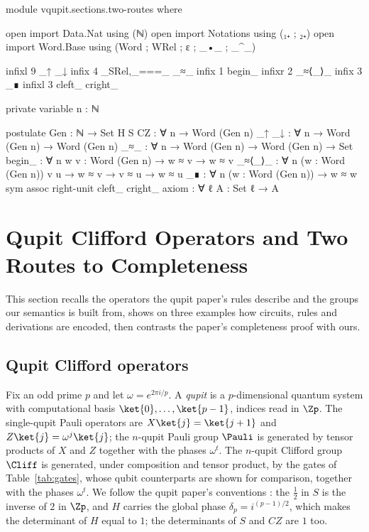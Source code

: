 \begin{code}[hide]
module vqupit.sections.two-routes where

open import Data.Nat using (ℕ)
open import Notations using (₁₊ ; ₂₊)
open import Word.Base using (Word ; WRel ; ε ; _•_ ; _^_)

infixl 9 _↑ _↓
infix 4 _SRel,_===_ _≈_
infix 1 begin_
infixr 2 _≈⟨_⟩_
infix 3 _∎
infixl 3 cleft_ cright_

private variable
  n : ℕ

postulate
  Gen : ℕ → Set
  H S CZ : ∀ {n} → Word (Gen n)
  _↑ _↓ : ∀ {n} → Word (Gen n) → Word (Gen n)
  _≈_ : ∀ {n} → Word (Gen n) → Word (Gen n) → Set
  begin_ : ∀ {n} {w v : Word (Gen n)} → w ≈ v → w ≈ v
  _≈⟨_⟩_ : ∀ {n} (w : Word (Gen n)) {v u} → w ≈ v → v ≈ u → w ≈ u
  _∎ : ∀ {n} (w : Word (Gen n)) → w ≈ w
  sym assoc right-unit cleft_ cright_ axiom : ∀ {ℓ} {A : Set ℓ} → A
\end{code}
\section{Qupit Clifford Operators and Two Routes to Completeness}\label{sec:two-routes}

This section recalls the operators the qupit paper's rules describe and
the groups our semantics is built from, shows on three examples how
circuits, rules and derivations are encoded, then contrasts the
paper's completeness proof with ours.

\subsection{Qupit Clifford operators}\label{sec:operators}

Fix an odd prime $p$ and let $\omega = e^{2\pi i/p}$.  A \emph{qupit} is
a $p$-dimensional quantum system with computational basis
$\ket{0},\dots,\ket{p-1}$, indices read in $\Zp$.  The single-qupit Pauli
operators are $X\ket{j} = \ket{j+1}$ and $Z\ket{j} = \omega^{j}\ket{j}$;
the $n$-qupit Pauli group $\Pauli$ is generated by tensor products of $X$
and $Z$ together with the phases $\omega^t$.  The $n$-qupit Clifford
group $\Cliff$ is generated, under composition and tensor product, by the
gates of Table~\ref{tab:gates}, whose qubit counterparts are shown for
comparison, together with the phases $\omega^t$.  We follow the qupit paper's conventions
\cite{bian2026qudit}: the $\tfrac12$ in $S$ is the inverse of $2$ in
$\Zp$, and $H$ carries the global phase $\delta_p = i^{(p-1)/2}$, which
makes the determinant of $H$ equal to $1$; the determinants of $S$ and
$CZ$ are $1$ too.

